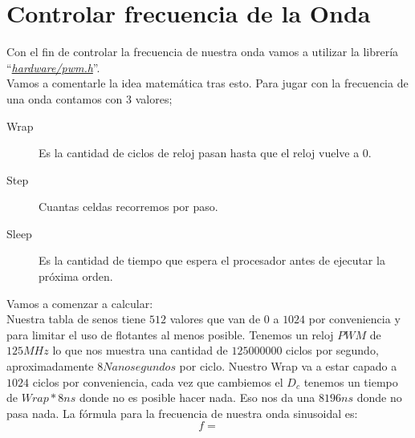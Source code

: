 \documentclass[]{article}
\begin{document}
\section*{Controlar frecuencia de la Onda}
	Con el fin de controlar la frecuencia de nuestra onda vamos a utilizar la librería ``\href{https://raspberrypi.github.io/pico-sdk-doxygen/group__hardware__pwm.html}{\textit{hardware/pwm.h}}''.\\
	Vamos a comentarle la idea matemática tras esto.
	Para jugar con la frecuencia de una onda contamos con 3 valores;
	\begin{description}
		\item [Wrap] Es la cantidad de ciclos de reloj pasan hasta que el reloj vuelve a 0.
		\item [Step] Cuantas celdas recorremos por paso.
		\item [Sleep] Es la cantidad de tiempo que espera el procesador antes de ejecutar la próxima orden.
	\end{description}
	Vamos a comenzar a calcular:\\ 
	Nuestra tabla de senos tiene $512$ valores que van de $0$ a $1024$ por conveniencia y para limitar el uso de flotantes al menos posible.
	Tenemos un reloj $PWM$ de $125MHz$ lo que nos muestra una cantidad de $125000000$ ciclos por segundo, aproximadamente $8 Nano segundos$ por ciclo. Nuestro Wrap va a estar capado a $1024$ ciclos por conveniencia, cada vez que cambiemos el $D_{c}$ tenemos un tiempo de $Wrap*8ns$ donde no es posible hacer nada. Eso nos da una $8196ns$ donde no pasa nada.
	La fórmula para la frecuencia de nuestra onda sinusoidal es:
	\[ f =  \]
\end{document}
